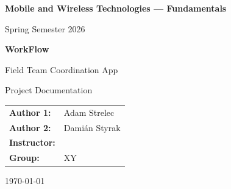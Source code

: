 \documentclass[12pt, a4paper]{report}
\begin{document}
\begin{titlepage}
  \centering
  \vspace*{2cm}
  {\LARGE\bfseries Mobile and Wireless Technologies — Fundamentals\par}
  \vspace{0.5cm}
  {\large Spring Semester 2026\par}
  \vspace{2cm}
  {\Huge\bfseries WorkFlow\par}
  \vspace{0.3cm}
  {\Large Field Team Coordination App\par}
  \vspace{0.5cm}
  {\large Project Documentation\par}
  \vspace{3cm}
  \begin{tabular}{ll}
    \textbf{Author 1:} & Adam Strelec \\[4pt]
    \textbf{Author 2:} & Damián Styrak \\[4pt]
    \textbf{Instructor:} &  \\[4pt]
    \textbf{Group:} & XY \\
  \end{tabular}
  \vfill
  {\large \today}
\end{titlepage}

\tableofcontents
\clearpage









\end{document}
